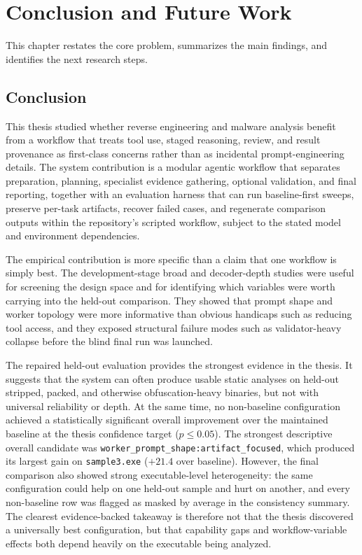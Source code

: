 \chapter{Conclusion and Future Work}
\label{sec:conclusion}

This chapter restates the core problem, summarizes the main findings, and identifies the next research steps.

\section{Conclusion}

This thesis studied whether reverse engineering and malware analysis benefit from a workflow that treats tool use, staged reasoning, review, and result provenance as first-class concerns rather than as incidental prompt-engineering details. The system contribution is a modular agentic workflow that separates preparation, planning, specialist evidence gathering, optional validation, and final reporting, together with an evaluation harness that can run baseline-first sweeps, preserve per-task artifacts, recover failed cases, and regenerate comparison outputs within the repository's scripted workflow, subject to the stated model and environment dependencies.

The empirical contribution is more specific than a claim that one workflow is simply best. The development-stage broad and decoder-depth studies were useful for screening the design space and for identifying which variables were worth carrying into the held-out comparison. They showed that prompt shape and worker topology were more informative than obvious handicaps such as reducing tool access, and they exposed structural failure modes such as validator-heavy collapse before the blind final run was launched.

The repaired held-out evaluation provides the strongest evidence in the thesis. It suggests that the system can often produce usable static analyses on held-out stripped, packed, and otherwise obfuscation-heavy binaries, but not with universal reliability or depth. At the same time, no non-baseline configuration achieved a statistically significant overall improvement over the maintained baseline at the thesis confidence target ($p \le 0.05$). The strongest descriptive overall candidate was \texttt{worker\_prompt\_shape:artifact\_focused}, which produced its largest gain on \texttt{sample3.exe} ($+21.4$ over baseline). However, the final comparison also showed strong executable-level heterogeneity: the same configuration could help on one held-out sample and hurt on another, and every non-baseline row was flagged as masked by average in the consistency summary. The clearest evidence-backed takeaway is therefore not that the thesis discovered a universally best configuration, but that capability gaps and workflow-variable effects both depend heavily on the executable being analyzed.

